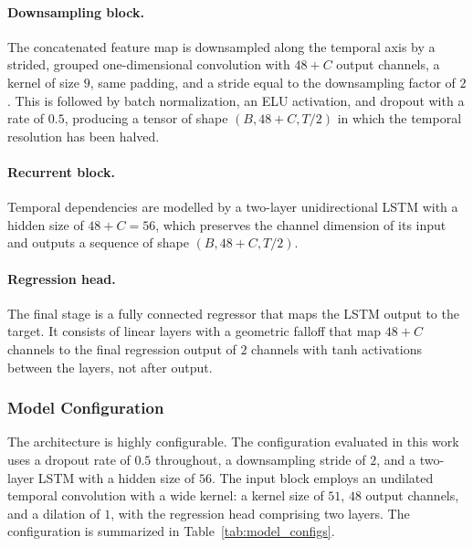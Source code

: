 \documentclass[12pt,DIV16,BCOR12mm,a4paper,footinclude=false,headinclude,parskip=half-,twoside,openright,cleardoublepage=empty,toc=index,bibliography=totoc,listof=totoc]{scrreprt}
\numberwithin{equation}{chapter}
\begin{document}
  \paragraph{Downsampling block.}
  The concatenated feature map is downsampled along the temporal axis by a strided,
  grouped one-dimensional convolution with $48 + C$ output channels, a kernel of
  size $9$, same padding, and a stride equal to the downsampling factor of $2$. This
  is followed by batch normalization, an ELU activation, and dropout with a rate of
  $0.5$, producing a tensor of shape $(B, 48 + C, T/2)$ in which the temporal
  resolution has been halved.

  \paragraph{Recurrent block.}
  Temporal dependencies are modelled by a two-layer unidirectional LSTM with a
  hidden size of $48 + C = 56$, which preserves the channel dimension of its input
  and outputs a sequence of shape $(B, 48 + C, T/2)$.

  \paragraph{Regression head.}
  The final stage is a fully connected regressor that maps the LSTM output to the
  target. It consists of linear layers with a geometric falloff that map $48 + C$ 
  channels to the final regression output of $2$ channels with tanh activations
  between the layers, not after output. 

  \subsubsection{Model Configuration}

  The architecture is highly configurable. The configuration evaluated in this work
  uses a dropout rate of $0.5$ throughout, a downsampling stride of $2$, and a
  two-layer LSTM with a hidden size of $56$. The input block employs an undilated
  temporal convolution with a wide kernel: a kernel size of $51$, $48$ output
  channels, and a dilation of $1$, with the regression head comprising two layers.
  The configuration is summarized in Table~\ref{tab:model_configs}.
\end{document}

